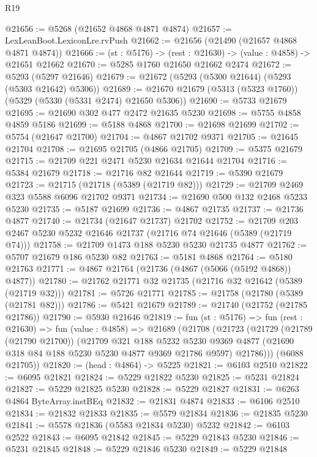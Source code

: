 \begin{lexlean}{R19}
\begin{coremodule}
@21656 := @5268 (@21652 @4868 @4871 @4874)
@21657 := LexLeanBoot.LexiconLre.rvPush
@21662 := @21656 (@21490 (@21657 @4868 @4871 @4874))
@21666 := (st : @5176) -> (rest : @21630) -> (value : @4858) -> @21651 @21662
@21670 := @5285 @1760 @21650 @21662 @2474
@21672 := @5293 (@5297 @21646)
@21679 := @21672 (@5293 (@5300 @21644) (@5293 (@5303 @21642) @5306))
@21689 := @21670 @21679 (@5313 (@5323 @1760)) (@5329 (@5330 (@5331 @2474) @21650 @5306))
@21690 := @5733 @21679
@21695 := @21690 @302 @477 @2472 @21635 @5230
@21698 := @5755 @4858 @4859 @5186
@21699 := @5188 @4868
@21700 := @21698 @21699
@21702 := @5754 (@21647 @21700)
@21704 := @4867 @21702 @9371
@21705 := @21645 @21704
@21708 := @21695 @21705 (@4866 @21705)
@21709 := @5375 @21679
@21715 := @21709 @221 @2471 @5230 @21634 @21644 @21704
@21716 := @5384 @21679
@21718 := @21716 @82 @21644
@21719 := @5390 @21679
@21723 := @21715 (@21718 (@5389 (@21719 @82)))
@21729 := @21709 @2469 @323 @5588 @6096 @21702 @9371
@21734 := @21690 @500 @132 @2468 @5233 @5230
@21735 := @5187 @21699
@21736 := @4867 @21735
@21737 := @21736 @4877
@21740 := @21734 (@21647 @21737) @21702
@21752 := @21709 @203 @2467 @5230 @5232 @21646 @21737 (@21716 @74 @21646 (@5389 (@21719 @74)))
@21758 := @21709 @1473 @188 @5230 @5230 @21735 @4877
@21762 := @5707 @21679 @186 @5230 @82
@21763 := @5181 @4868
@21764 := @5180 @21763
@21771 := @4867 @21764 (@21736 (@4867 (@5066 (@5192 @4868)) @4877))
@21780 := @21762 @21771 @32 @21735 (@21716 @32 @21642 (@5389 (@21719 @32)))
@21781 := @5726 @21771
@21785 := @21758 (@21780 (@5389 (@21781 @82)))
@21786 := @5421 @21679
@21789 := @21740 (@21752 (@21785 @21786))
@21790 := @5930 @21646
@21819 := fun (st : @5176) =>
  fun (rest : @21630) =>
  fun (value : @4858) =>
  @21689
    (@21708
      (@21723
        (@21729
          (@21789 (@21790 @21700))
          (@21709
            @321
            @188
            @5232
            @5230
            @9369
            @4877
            (@21690 @318 @84 @188 @5230 @5230 @4877 @9369 @21786 @9597)
            @21786)))
      (@6088 @21705))
@21820 := (head : @4864) -> @5225
@21821 := @6103 @2510
@21822 := @6095 @21821
@21824 := @5229 @21822 @5230
@21825 := @5231 @21824
@21827 := @5229 @21825 @5230
@21828 := @5229 @21827
@21831 := @6263 @4864 ByteArray.instBEq
@21832 := @21831 @4874
@21833 := @6106 @2510
@21834 := @21832 @21833
@21835 := @5579 @21834
@21836 := @21835 @5230
@21841 := @5578 @21836 (@5583 @21834 @5230) @5232
@21842 := @6103 @2522
@21843 := @6095 @21842
@21845 := @5229 @21843 @5230
@21846 := @5231 @21845
@21848 := @5229 @21846 @5230
@21849 := @5229 @21848

\end{coremodule}
\end{lexlean}
